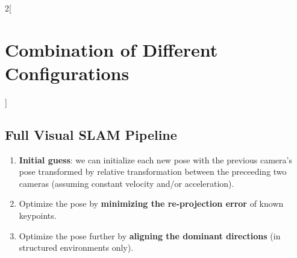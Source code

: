 \documentclass[oneside,fontsize=11pt,paper=a4]{scrartcl}
\begin{document}
\begin{multicols}{2}[\section{Combination of Different Configurations}]
\subsection{Full Visual SLAM Pipeline}
\begin{enumerate}
    \item \textbf{Initial guess}: we can initialize each new pose with the previous camera's pose transformed by relative transformation between the preceeding two cameras (assuming constant velocity and/or acceleration).
    \item Optimize the pose by \textbf{minimizing the re-projection error} of known keypoints.
    \item Optimize the pose further by \textbf{aligning the dominant directions} (in structured environments only). 
\end{enumerate}

\end{multicols}
\newpage



\end{document}
